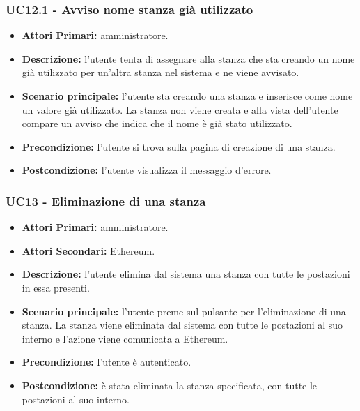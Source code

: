 \subsubsection{ UC12.1 - Avviso nome stanza già utilizzato}
\begin{itemize}
	\item\textbf{Attori Primari:}
	amministratore.
	\item\textbf{Descrizione:}
	l'utente tenta di assegnare alla stanza che sta creando un nome già utilizzato per un'altra stanza nel sistema e ne viene avvisato.
	\item\textbf{Scenario principale:}
	l'utente sta creando una stanza e inserisce come nome un valore già utilizzato.
	La stanza non viene creata e alla vista dell'utente compare un avviso che indica che il nome è già stato utilizzato.
	\item\textbf{Precondizione:}
	l'utente si trova sulla pagina di creazione di una stanza.
	\item\textbf{Postcondizione:}
	l'utente visualizza il messaggio d'errore.
\end{itemize}

\subsubsection{ UC13 - Eliminazione di una stanza}
\begin{itemize}
	\item\textbf{Attori Primari:}
	amministratore.
	\item\textbf{Attori Secondari:}
	Ethereum.
	\item\textbf{Descrizione:} 
	l'utente elimina dal sistema una stanza con tutte le postazioni in essa presenti.
	\item\textbf{Scenario principale:} 
	l'utente preme sul pulsante per l'eliminazione di una stanza. La stanza viene eliminata dal sistema con tutte le postazioni al suo interno e l'azione viene comunicata a Ethereum.
	\item\textbf{Precondizione:} 
	l'utente è autenticato.
	\item\textbf{Postcondizione:}
	è stata eliminata la stanza specificata, con tutte le postazioni al suo interno.
\end{itemize}

